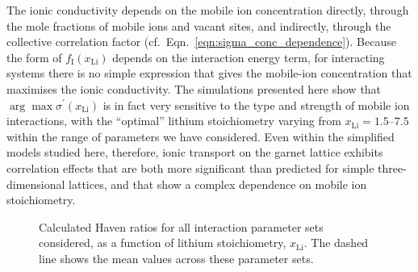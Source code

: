 \documentclass[aps,prb,twocolumn,superscriptaddress,reprint]{revtex4-1}
\newcommand{\xLi}{x_\m{Li}}
\newcommand{\m}[1]{\mathrm{#1}}
\begin{document}
The ionic conductivity depends on the mobile ion concentration directly, through the mole fractions of mobile ions and vacant sites, and indirectly, through the collective correlation factor (cf.\ Eqn.~\ref{eqn:sigma_conc_dependence}). Because the form of $f_\m{I}(\xLi)$ depends on the interaction energy term, for interacting systems there is no simple expression that gives the mobile-ion concentration that maximises the ionic conductivity. The simulations presented here show that $\arg \max \sigma^\prime(\xLi)$ is in fact very sensitive to the type and strength of mobile ion interactions, with the ``optimal'' lithium stoichiometry varying from $\xLi=1.5$--$7.5$ within the range of parameters we have considered. Even within the simplified models studied here, therefore, ionic transport on the garnet lattice exhibits correlation effects that are both more significant than predicted for simple three-dimensional lattices, and that show a complex dependence on mobile ion stoichiometry.

\begin{figure}[tb]
  \centering
    \caption{\label{fig:haven_ratios}Calculated Haven ratios for all interaction parameter sets considered, as a function of lithium stoichiometry, $\xLi$. The dashed line shows the mean values across these parameter sets.}
\end{figure}
\end{document}
